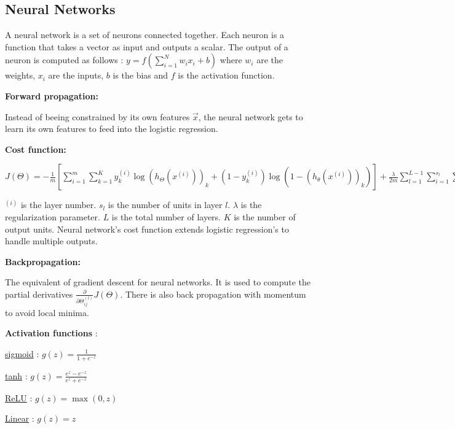 \subsection*{Neural Networks}
A neural network is a set of neurons connected together. Each neuron is a function
that takes a vector as input and outputs a scalar. The output of a neuron is
computed as follows : $y = f(\sum_{i=1}^{N} w_i x_i + b)$ where $w_i$ are the weights,
$x_i$ are the inputs, $b$ is the bias and $f$ is the activation function.

\textbf{Forward propagation:}

Instead of beeing constrained by its own features
$\overrightarrow{x}$, the neural network gets to learn its own features
to feed into the logistic regression.

\textbf{Cost function:}

$J(\Theta)=-\frac{1}{m}[\sum_{i=1}^{m}\sum_{k=1}^{K}y_k^{(i)}\log(h_\Theta(x^{(i)}))_k+(1-y_k^{(i)})\log(1-(h_\theta(x^{(i)}))_k)]+\frac{\lambda}{2m}\sum_{l=1}^{L-1}\sum_{i=1}^{s_l}\sum_{j=1}^{s_{l+1}}(\Theta_{ji}^{(l)})^2$

$^{(i)}$ is the layer number. $s_l$ is the number of units in layer $l$. $\lambda$ is the regularization parameter. $L$ is the total number of layers. $K$ is the number of output units.
Neural network's cost function extends logistic regression's to handle multiple outputs.

\textbf{Backpropagation:}

The equivalent of gradient descent for neural networks.
It is used to compute the partial derivatives $\frac{\partial}{\partial\Theta_{ij}^{(l)}}J(\Theta)$.
There is also back propagation with momentum to avoid local minima.

\textbf{Activation functions} :

\underline{sigmoid} : $g(z)=\frac{1}{1+e^{-z}}$

\underline{tanh} : $g(z)=\frac{e^z-e^{-z}}{e^z+e^{-z}}$

\underline{ReLU} : $g(z)=\max(0,z)$

\underline{Linear} : $g(z)=z$